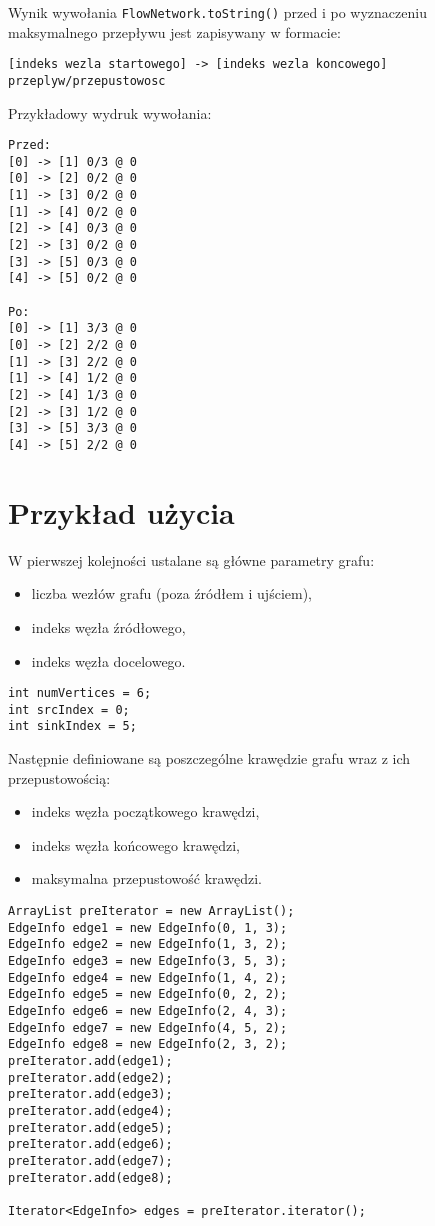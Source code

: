 \documentclass[10pt]{dokument-tiwo}
\begin{document}
\noindent
Wynik wywołania \texttt{FlowNetwork.toString()} przed i po
wyznaczeniu maksymalnego przepływu jest zapisywany w formacie:

\begin{lstlisting}
[indeks wezla startowego] -> [indeks wezla koncowego] przeplyw/przepustowosc
\end{lstlisting}

\noindent
Przykładowy wydruk wywołania:

\begin{lstlisting}
Przed:
[0] -> [1] 0/3 @ 0
[0] -> [2] 0/2 @ 0
[1] -> [3] 0/2 @ 0
[1] -> [4] 0/2 @ 0
[2] -> [4] 0/3 @ 0
[2] -> [3] 0/2 @ 0
[3] -> [5] 0/3 @ 0
[4] -> [5] 0/2 @ 0

Po:
[0] -> [1] 3/3 @ 0
[0] -> [2] 2/2 @ 0
[1] -> [3] 2/2 @ 0
[1] -> [4] 1/2 @ 0
[2] -> [4] 1/3 @ 0
[2] -> [3] 1/2 @ 0
[3] -> [5] 3/3 @ 0
[4] -> [5] 2/2 @ 0
\end{lstlisting}


\section{Przykład użycia}
W pierwszej kolejności ustalane są główne parametry grafu:
\begin{itemize}
\item liczba wezłów grafu (poza źródłem i ujściem),
\item indeks węzła źródłowego,
\item indeks węzła docelowego.
\end{itemize}
\begin{lstlisting}
int numVertices = 6;
int srcIndex = 0;
int sinkIndex = 5;
\end{lstlisting}

Następnie definiowane są poszczególne krawędzie grafu wraz z ich
przepustowością:
\begin{itemize}
\item indeks węzła początkowego krawędzi,
\item indeks węzła końcowego krawędzi,
\item maksymalna przepustowość krawędzi.
\end{itemize}
\begin{lstlisting}
ArrayList preIterator = new ArrayList();
EdgeInfo edge1 = new EdgeInfo(0, 1, 3);
EdgeInfo edge2 = new EdgeInfo(1, 3, 2);
EdgeInfo edge3 = new EdgeInfo(3, 5, 3);
EdgeInfo edge4 = new EdgeInfo(1, 4, 2);
EdgeInfo edge5 = new EdgeInfo(0, 2, 2);
EdgeInfo edge6 = new EdgeInfo(2, 4, 3);
EdgeInfo edge7 = new EdgeInfo(4, 5, 2);
EdgeInfo edge8 = new EdgeInfo(2, 3, 2);
preIterator.add(edge1);
preIterator.add(edge2);
preIterator.add(edge3);
preIterator.add(edge4);
preIterator.add(edge5);
preIterator.add(edge6);
preIterator.add(edge7);
preIterator.add(edge8);

Iterator<EdgeInfo> edges = preIterator.iterator();
\end{lstlisting}
\end{document}
